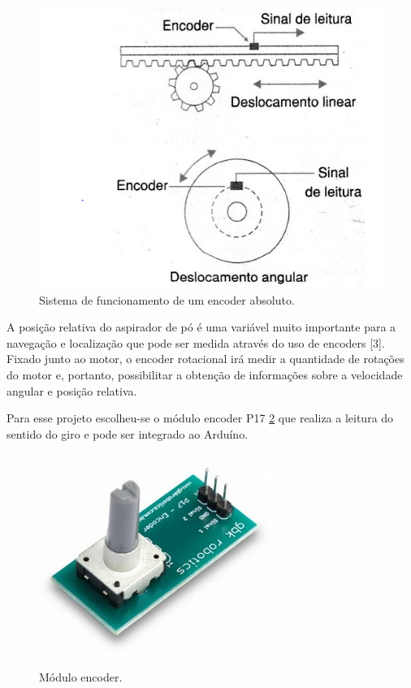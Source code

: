 \begin{enumerate}
					\begin{figure}[H]
						\centering
						\includegraphics[scale=0.6]{figuras/encoder.png}
						\caption{Sistema de funcionamento de um encoder absoluto.}
						\label{img:encoder}
					\end{figure}

					A posição relativa do aspirador de pó é uma variável muito importante para a navegação e localização que pode ser medida através do uso de encoders [3]. Fixado junto ao motor, o encoder rotacional irá medir a quantidade de rotações do motor e, portanto, possibilitar a obtenção de informações sobre a velocidade angular e posição relativa. 

					Para esse projeto escolheu-se o módulo encoder P17 \ref{img:modulo_encoder} que realiza a leitura do sentido do giro e pode ser integrado ao Arduíno.

					\begin{figure}[H]
						\centering
						\includegraphics[scale=0.6]{figuras/modulo_encoder.png}
						\caption{Módulo encoder.}
						\label{img:modulo_encoder}
					\end{figure}

			\end{enumerate}



